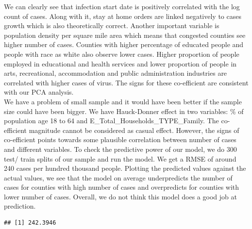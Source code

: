 \documentclass[
]{article}
\begin{document}
We can clearly see that infection start date is positively correlated
with the log count of cases. Along with it, stay at home orders are
linked negatively to cases growth which is also theoretically correct.
Another important variable is population density per square mile area
which means that congested counties see higher number of cases. Counties
with higher percentage of educated people and people with race as white
also observe lower cases. Higher proportion of people employed in
educational and health services and lower proportion of people in arts,
recreational, accommodation and public administration industries are
correlated with higher cases of virus. The signs for these co-efficient
are consistent with our PCA analysis.\\
We have a problem of small sample and it would have been better if the
sample size could have been bigger. We have Hauck-Donner effect in two
variables: \% of population age 18 to 64 and
E\_Total\_Households\_TYPE\_Family. The co-efficient magnitude cannot be
considered as casual effect. However, the signs of co-efficient points
towards some plausible correlation between number of cases and different
variables. To check the predictive power of our model, we do 300 test/
train splits of our sample and run the model. We get a RMSE of around
240 cases per hundred thousand people. Plotting the predicted values
against the actual values, we see that the model on average
underpredicts the number of cases for counties with high number of cases
and overpredicts for counties with lower number of cases. Overall, we do
not think this model does a good job at prediction.

\begin{verbatim}
## [1] 242.3946
\end{verbatim}
\end{document}
